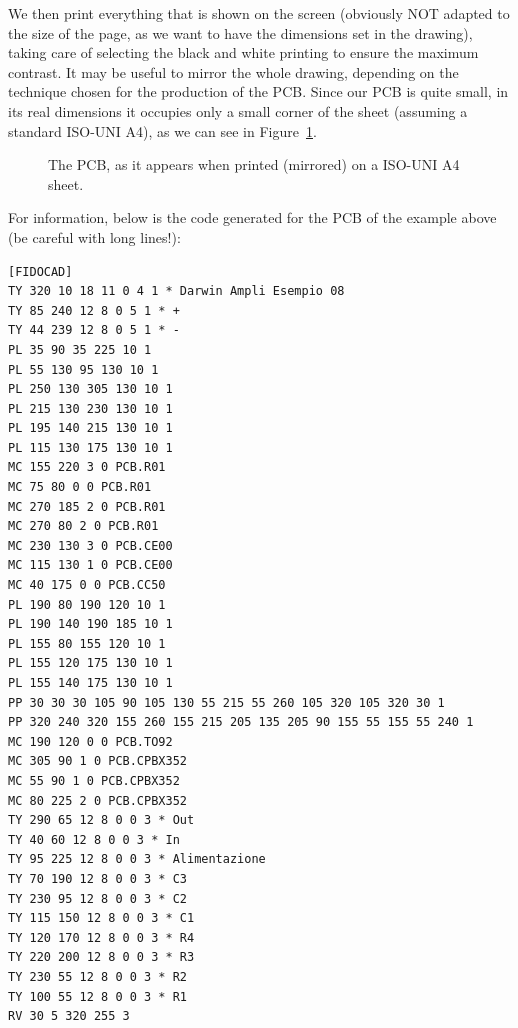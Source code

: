 \documentclass[10pt,a4paper,twoside]{scrreprt}
\begin{document}
We then print everything that is shown on the screen (obviously
NOT adapted to the size of the page, as we want to have the dimensions
set in the drawing), taking care of selecting the black and white
printing to ensure the maximum contrast. It may be useful to mirror
the whole drawing, depending on the technique chosen for the production
of the PCB. Since our PCB is quite small, in its real
dimensions it occupies only a small corner of the sheet (assuming
a standard ISO-UNI A4), as we can see in Figure~\ref{fig_amplificateur_impression}.

%
\begin{figure}
\centering {}

\caption{The PCB, as it appears when printed (mirrored) on a ISO-UNI A4 sheet.}


\label{fig_amplificateur_impression}
\end{figure}


For information, below is the code generated for the PCB of the example
above (be careful with long lines!):
\begin{lstlisting}
[FIDOCAD]
TY 320 10 18 11 0 4 1 * Darwin Ampli Esempio 08
TY 85 240 12 8 0 5 1 * +
TY 44 239 12 8 0 5 1 * -
PL 35 90 35 225 10 1
PL 55 130 95 130 10 1
PL 250 130 305 130 10 1
PL 215 130 230 130 10 1
PL 195 140 215 130 10 1
PL 115 130 175 130 10 1
MC 155 220 3 0 PCB.R01
MC 75 80 0 0 PCB.R01
MC 270 185 2 0 PCB.R01
MC 270 80 2 0 PCB.R01
MC 230 130 3 0 PCB.CE00
MC 115 130 1 0 PCB.CE00
MC 40 175 0 0 PCB.CC50
PL 190 80 190 120 10 1
PL 190 140 190 185 10 1
PL 155 80 155 120 10 1
PL 155 120 175 130 10 1
PL 155 140 175 130 10 1
PP 30 30 30 105 90 105 130 55 215 55 260 105 320 105 320 30 1
PP 320 240 320 155 260 155 215 205 135 205 90 155 55 155 55 240 1
MC 190 120 0 0 PCB.TO92
MC 305 90 1 0 PCB.CPBX352
MC 55 90 1 0 PCB.CPBX352
MC 80 225 2 0 PCB.CPBX352
TY 290 65 12 8 0 0 3 * Out
TY 40 60 12 8 0 0 3 * In
TY 95 225 12 8 0 0 3 * Alimentazione
TY 70 190 12 8 0 0 3 * C3
TY 230 95 12 8 0 0 3 * C2
TY 115 150 12 8 0 0 3 * C1
TY 120 170 12 8 0 0 3 * R4
TY 220 200 12 8 0 0 3 * R3
TY 230 55 12 8 0 0 3 * R2
TY 100 55 12 8 0 0 3 * R1
RV 30 5 320 255 3
\end{lstlisting}
\end{document}
